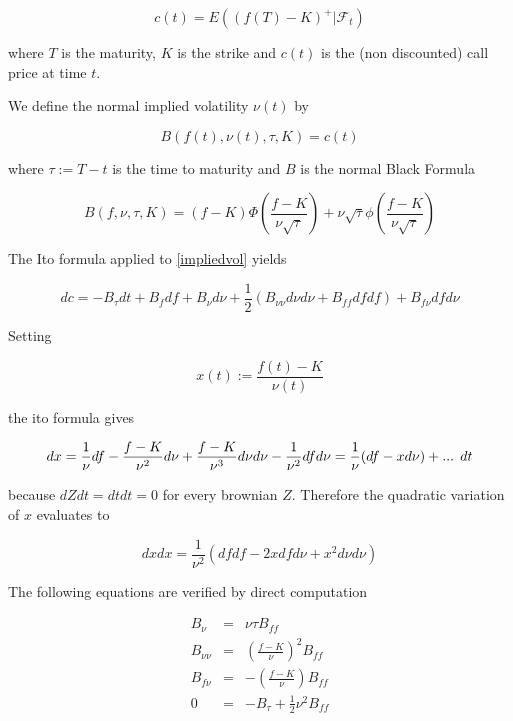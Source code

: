 \documentclass{amsart}
\theoremstyle{plain}
\numberwithin{equation}{section}
\begin{document}
\begin{equation}
c(t) = E( (f(T)-K)^+ | \mathcal{F}_t )
\end{equation}

where $T$ is the maturity, $K$ is the strike and $c(t)$ is the (non discounted) call price at time $t$.

We define the normal implied volatility $\nu(t)$ by

\begin{equation} \label{impliedvol}
B(f(t),\nu(t),\tau,K) = c(t)
\end{equation}

where $\tau := T-t$ is the time to maturity and $B$ is the normal Black Formula

\begin{equation}
B(f,\nu,\tau,K) = (f-K) \Phi \left( \frac{f-K}{\nu\sqrt{\tau}} \right) + 
                                   \nu\sqrt{\tau} \phi \left( \frac{f-K}{\nu\sqrt{\tau}} \right)
\end{equation}

The Ito formula applied to \ref{impliedvol} yields

\begin{equation} \label{cdynamic}
dc = -B_\tau dt + B_f df + B_\nu d\nu + \frac{1}{2} \left( B_{\nu\nu} d\nu d\nu + B_{ff} df df \right) + B_{f\nu} df d\nu 
\end{equation}

Setting 

\begin{equation}
x(t) := \frac{f(t)-K}{\nu(t)}
\end{equation}

the ito formula gives

\begin{equation}
dx = \frac{1}{\nu} df - \frac{f-K}{\nu^2} d\nu + \frac{f-K}{\nu^3} d\nu d\nu - \frac{1}{\nu^2} dfd\nu
 = \frac{1}{\nu} ( df - x d\nu ) + \textnormal{... }dt
\end{equation} 

because $dZ dt = dt dt = 0$ for every brownian $Z$. Therefore the quadratic variation of $x$ evaluates to

\begin{equation} \label{quadVarX}
dx dx = \frac{1}{\nu^2} ( df df - 2 x df d\nu + x^2 d\nu d\nu )
\end{equation}

The following equations are verified by direct computation

\begin{eqnarray} \label{propB}
B_\nu &=& \nu \tau B_{ff} \\
B_{\nu\nu} &=& \left( \frac{f-K}{\nu} \right) ^2 B_{ff} \\
B_{f \nu} &=& - \left( \frac{f-K}{\nu} \right) B_{ff} \\
0 &=& -B_\tau + \frac{1}{2} \nu^2 B_{ff}
\end{eqnarray}
\end{document}
